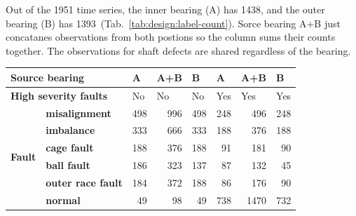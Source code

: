 Out of the 1951 time series, the inner bearing (A) has 1438, and the outer bearing (B) has 1393~(Tab.~\ref{tab:design:label-count}). Sorce bearing A+B just concatanes observations from both postions so the column sums their counts together. The observations for shaft defects are shared regardless of the bearing. 
\begin{table}[h]
\renewcommand{\arraystretch}{1.2}
\centering
\begin{tabular}{|ll|r|r|r|r|r|r|}
\hline
\multicolumn{2}{|l|}{\textbf{Source bearing}}                                            & \multicolumn{1}{l|}{A}  & \multicolumn{1}{l|}{A+B} & \multicolumn{1}{l|}{B}  & \multicolumn{1}{l|}{A}   & \multicolumn{1}{l|}{A+B} & \multicolumn{1}{l|}{B}   \\ \hline
\multicolumn{2}{|l|}{\textbf{High severity faults}}                                & \multicolumn{1}{l|}{No} & \multicolumn{1}{l|}{No}  & \multicolumn{1}{l|}{No} & \multicolumn{1}{l|}{Yes} & \multicolumn{1}{l|}{Yes} & \multicolumn{1}{l|}{Yes} \\ \hline
\multicolumn{1}{|l|}{\multirow{6}{*}{\textbf{Fault}}} & \textbf{misalignment}     & 498                     & 996                      & 498                     & 248                      & 496                      & 248                      \\ \cline{2-8} 
\multicolumn{1}{|l|}{}                                & \textbf{imbalance}        & 333                     & 666                      & 333                     & 188                      & 376                      & 188                      \\ \cline{2-8} 
\multicolumn{1}{|l|}{}                                & \textbf{cage fault}       & 188                     & 376                      & 188                     & 91                       & 181                      & 90                       \\ \cline{2-8} 
\multicolumn{1}{|l|}{}                                & \textbf{ball fault}       & 186                     & 323                      & 137                     & 87                       & 132                      & 45                       \\ \cline{2-8} 
\multicolumn{1}{|l|}{}                                & \textbf{outer race fault} & 184                     & 372                      & 188                     & 86                       & 176                      & 90                       \\ \cline{2-8} 
\multicolumn{1}{|l|}{}                                & \textbf{normal}           & 49                      & 98                       & 49                      & 738                      & 1470                     & 732                      \\ \hline

\end{tabular}
\end{table}
